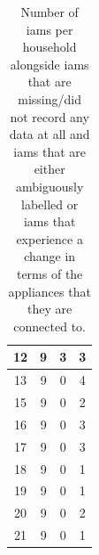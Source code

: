 \begin{table}[H]
\begin{adjustwidth*}{-0.5cm}{-0.5cm}
\begin{tabular}{cccc}
                        12                        & 9                           & 3                            & 3                              \\ \midrule
                        13                        & 9                           & 0                            & 4                              \\ \midrule
                        15                        & 9                           & 0                            & 2                              \\ \midrule
                        16                        & 9                           & 0                            & 3                              \\ \midrule
                        17                        & 9                           & 0                            & 3                              \\ \midrule
                        18                        & 9                           & 0                            & 1                              \\ \midrule
                        19                        & 9                           & 0                            & 1                              \\ \midrule
                        20                        & 9                           & 0                            & 2                              \\ \midrule
                        21                        & 9                           & 0                            & 1                              \\ \bottomrule
                \end{tabular}
                \caption{Number of \glspl{iam} per household alongside \glspl{iam} that are missing/did not record any data at all and \glspl{iam} that are either ambiguously labelled or \glspl{iam} that experience a change in terms of the appliances that they are connected to.}
                \label{tab:REFIT-missing-labels}
        \end{adjustwidth*}
\end{table}

